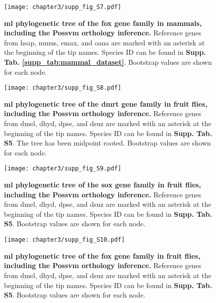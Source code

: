 \documentclass[../main.tex]{subfiles}
\begin{document}
\begin{figure}[ht]
	\centering
	\texttt{[image: chapter3/supp\_fig\_S7.pdf]}
	\captionsetup{width=\textwidth}
	\caption{
		\textbf{\gls{ml} phylogenetic tree of the \gls{fox} gene family in mammals, including the Possvm orthology inference.} Reference genes from \gls{hsap}, \gls{mmus}, \gls{emax}, and \gls{oana} are marked with an asterisk at the beginning of the tip names. Species ID can be found in \textbf{Supp. Tab. \ref{supp_tab:mammal_dataset}}. Bootstrap values are shown for each node.
	}
	\label{suppFig:fox_mammals}
\end{figure}

\begin{figure}[ht]
	\centering
	\texttt{[image: chapter3/supp\_fig\_S8.pdf]}
	\captionsetup{width=\textwidth}
	\caption{
		\textbf{\gls{ml} phylogenetic tree of the \gls{dmrt} gene family in fruit flies, including the Possvm orthology inference.} Reference genes from \gls{dmel}, \gls{dhyd}, \gls{dpse}, and \gls{dsuz} are marked with an asterisk at the beginning of the tip names. Species ID can be found in \textbf{Supp. Tab. S5}. The tree has been midpoint rooted. Bootstrap values are shown for each node.
	}
	\label{suppFig:dmrt_drosophila}
\end{figure}

\begin{figure}[ht]
	\centering
	\texttt{[image: chapter3/supp\_fig\_S9.pdf]}
	\captionsetup{width=\textwidth}
	\caption{
		\textbf{\gls{ml} phylogenetic tree of the \gls{sox} gene family in fruit flies, including the Possvm orthology inference.} Reference genes from \gls{dmel}, \gls{dhyd}, \gls{dpse}, and \gls{dsuz} are marked with an asterisk at the beginning of the tip names. Species ID can be found in \textbf{Supp. Tab. S5}. Bootstrap values are shown for each node.
	}
	\label{suppFig:sox_drosophila}
\end{figure}

\begin{figure}[ht]
	\centering
	\texttt{[image: chapter3/supp\_fig\_S10.pdf]}
	\captionsetup{width=\textwidth}
	\caption{
		\textbf{\gls{ml} phylogenetic tree of the \gls{fox} gene family in fruit flies, including the Possvm orthology inference.} Reference genes from \gls{dmel}, \gls{dhyd}, \gls{dpse}, and \gls{dsuz} are marked with an asterisk at the beginning of the tip names. Species ID can be found in \textbf{Supp. Tab. S5}. Bootstrap values are shown for each node.
	}
	\label{suppFig:fox_drosophila}
\end{figure}
\end{document}

